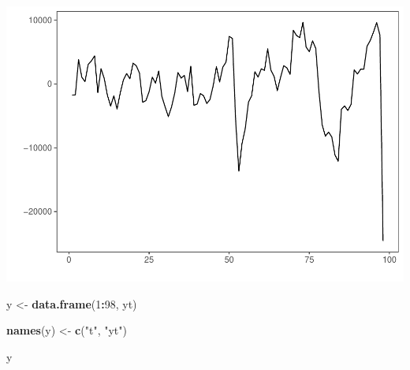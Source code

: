 \documentclass[
]{article}
\newenvironment{Shaded}{\begin{snugshade}}{\end{snugshade}}
\newcommand{\DecValTok}[1]{\textcolor[rgb]{0.00,0.00,0.81}{#1}}
\newcommand{\KeywordTok}[1]{\textcolor[rgb]{0.13,0.29,0.53}{\textbf{#1}}}
\newcommand{\NormalTok}[1]{#1}
\newcommand{\OperatorTok}[1]{\textcolor[rgb]{0.81,0.36,0.00}{\textbf{#1}}}
\newcommand{\StringTok}[1]{\textcolor[rgb]{0.31,0.60,0.02}{#1}}
\begin{document}
\begin{center}\includegraphics{Econo2_P5_files/figure-latex/stochastic yt-1} \end{center}

\begin{Shaded}
\begin{Highlighting}[]
\NormalTok{y <-}\StringTok{ }\KeywordTok{data.frame}\NormalTok{(}\DecValTok{1}\OperatorTok{:}\DecValTok{98}\NormalTok{, yt)}

\KeywordTok{names}\NormalTok{(y) <-}\StringTok{ }\KeywordTok{c}\NormalTok{(}\StringTok{"t"}\NormalTok{, }\StringTok{"yt"}\NormalTok{)}

\NormalTok{y}
\end{Highlighting}
\end{Shaded}
\end{document}
